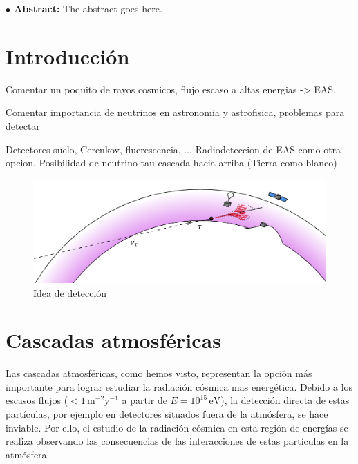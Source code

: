 \documentclass[12 pt, a4paper]{article} %
\numberwithin{equation}{section}
\numberwithin{figure}{section}
\numberwithin{table}{section}
\begin{document}
	
	\begin{flushleft}  {\bf $\bullet$ Abstract:\;\;}
		The abstract goes here.
	\end{flushleft}\mbox{}
	
	\clearpage
	\pagestyle{fancy}
	\lhead{}
	\chead{}
	\rhead{}
	\renewcommand{\headrulewidth}{0.1pt}
	\lfoot{} 
	\cfoot{\thepage}
	\rfoot{} 
	\renewcommand{\footrulewidth}{0pt}
	
	\setcounter{page}{1}
	\tableofcontents
	\clearpage
	
	\section{Introducción}\label{sec1}
	Comentar un poquito de rayos cosmicos, flujo escaso a altas energias -> EAS. 
	
	Comentar importancia de neutrinos en astronomia y astrofisica, problemas para detectar
	
	Detectores suelo, Cerenkov, fluerescencia, ... Radiodeteccion de EAS como otra opcion. Posibilidad de neutrino tau cascada hacia arriba (Tierra como blanco)
	
	\begin{figure}[H]
		\centering
		\includegraphics[width=.85\linewidth]{figures/shower_up}
		\caption{Idea de detección}
		\label{shower_up}
	\end{figure}
	\clearpage
	\section{Cascadas atmosféricas}\label{sec2}
%	
%	

Las cascadas atmosféricas, como hemos visto, representan la opción más importante para lograr estudiar la radiación cósmica mas energética. Debido a los escasos flujos ($<1\,\mathrm{m^{-2}y^{-1}}$ a partir de $E=10^{15}\,\mathrm{eV}$), la detección directa de estas partículas, por ejemplo en detectores situados fuera de la atmósfera, se hace inviable. Por ello, el estudio de la radiación cósmica en esta región de energías se realiza observando las consecuencias de las interacciones de estas partículas en la atmósfera. 
\end{document}
